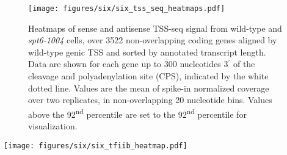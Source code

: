 \begin{figure}[H]
    \centering
    \texttt{[image: figures/six/six\_tss\_seq\_heatmaps.pdf]}
    \caption[Heatmaps of sense and antisense TSS-seq signal from wild-type and \textit{spt6-1004} cells, over non-overlapping coding genes.]{Heatmaps of sense and antisense TSS-seq signal from wild-type and \textit{spt6-1004} cells, over 3522 non-overlapping coding genes aligned by wild-type genic TSS and sorted by annotated transcript length. Data are shown for each gene up to 300 nucleotides 3$^\prime$ of the cleavage and polyadenylation site (CPS), indicated by the white dotted line. Values are the mean of spike-in normalized coverage over two replicates, in non-overlapping 20 nucleotide bins. Values above the 92\textsuperscript{nd} percentile are set to the 92\textsuperscript{nd} percentile for visualization.}
    \label{fig:six_tss_seq_heatmaps}
\end{figure}
\begin{SCfigure}[50][h]
    \centering
    \texttt{[image: figures/six/six\_tfiib\_heatmap.pdf]}
    \caption[Heatmaps of TFIIB ChIP-nexus protection from wild-type and \textit{spt6-1004} cells, over non-overlapping coding genes]{Heatmaps of TFIIB binding measured by ChIP-nexus, over the same regions shown in Figure \ref{fig:six_tss_seq_heatmaps}. Values are the mean of library-size normalized coverage over two replicates, in non-overlapping 20 bp bins. Values above the 85\textsuperscript{th} percentile are set to the 85\textsuperscript{th} percentile for visualization.}
    \label{fig:six_tfiib_heatmap}
\end{SCfigure}

\clearpage

